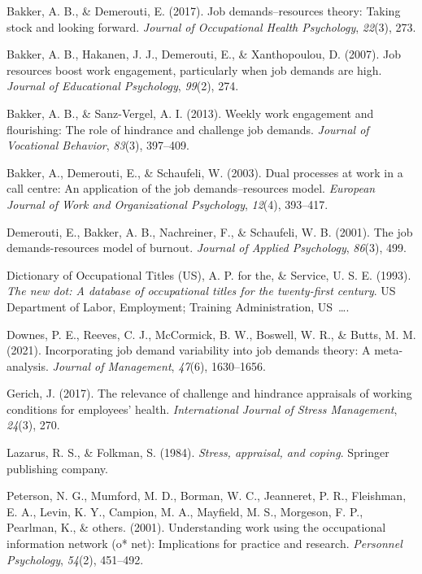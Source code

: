 \documentclass[
  english,
  man]{apa6}
\begin{document}
\leavevmode\hypertarget{ref-bakker2017job}{}%
Bakker, A. B., \& Demerouti, E. (2017). Job demands--resources theory: Taking stock and looking forward. \emph{Journal of Occupational Health Psychology}, \emph{22}(3), 273.

\leavevmode\hypertarget{ref-bakker2007job}{}%
Bakker, A. B., Hakanen, J. J., Demerouti, E., \& Xanthopoulou, D. (2007). Job resources boost work engagement, particularly when job demands are high. \emph{Journal of Educational Psychology}, \emph{99}(2), 274.

\leavevmode\hypertarget{ref-bakker2013weekly}{}%
Bakker, A. B., \& Sanz-Vergel, A. I. (2013). Weekly work engagement and flourishing: The role of hindrance and challenge job demands. \emph{Journal of Vocational Behavior}, \emph{83}(3), 397--409.

\leavevmode\hypertarget{ref-bakker2003dual}{}%
Bakker, A., Demerouti, E., \& Schaufeli, W. (2003). Dual processes at work in a call centre: An application of the job demands--resources model. \emph{European Journal of Work and Organizational Psychology}, \emph{12}(4), 393--417.

\leavevmode\hypertarget{ref-demerouti2001job}{}%
Demerouti, E., Bakker, A. B., Nachreiner, F., \& Schaufeli, W. B. (2001). The job demands-resources model of burnout. \emph{Journal of Applied Psychology}, \emph{86}(3), 499.

\leavevmode\hypertarget{ref-advisory1993new}{}%
Dictionary of Occupational Titles (US), A. P. for the, \& Service, U. S. E. (1993). \emph{The new dot: A database of occupational titles for the twenty-first century}. US Department of Labor, Employment; Training Administration, US~\ldots.

\leavevmode\hypertarget{ref-downes2021incorporating}{}%
Downes, P. E., Reeves, C. J., McCormick, B. W., Boswell, W. R., \& Butts, M. M. (2021). Incorporating job demand variability into job demands theory: A meta-analysis. \emph{Journal of Management}, \emph{47}(6), 1630--1656.

\leavevmode\hypertarget{ref-gerich2017relevance}{}%
Gerich, J. (2017). The relevance of challenge and hindrance appraisals of working conditions for employees' health. \emph{International Journal of Stress Management}, \emph{24}(3), 270.

\leavevmode\hypertarget{ref-lazarus1984stress}{}%
Lazarus, R. S., \& Folkman, S. (1984). \emph{Stress, appraisal, and coping}. Springer publishing company.

\leavevmode\hypertarget{ref-peterson2001understanding}{}%
Peterson, N. G., Mumford, M. D., Borman, W. C., Jeanneret, P. R., Fleishman, E. A., Levin, K. Y., Campion, M. A., Mayfield, M. S., Morgeson, F. P., Pearlman, K., \& others. (2001). Understanding work using the occupational information network (o* net): Implications for practice and research. \emph{Personnel Psychology}, \emph{54}(2), 451--492.
\end{document}
